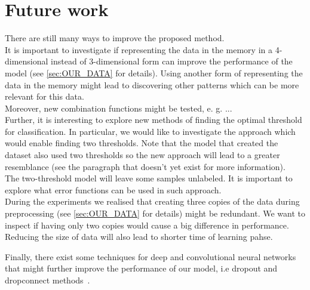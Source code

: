 \documentclass[a4paper,10pt]{report}
\begin{document}
    \section{Future work}
      There are still many ways to improve the proposed method.\\
      
      It is important to investigate if representing the data in the memory in a 4-dimensional instead of 3-dimensional form can improve the performance of the model (see \ref{sec:OUR_DATA} for details). Using another form of representing the data in the memory might lead to discovering other patterns which can be more relevant for this data.\\
      
      Moreover, new combination functions might be tested, e. g. ...\\ %
      
      Further, it is interesting to explore new methods of finding the optimal threshold for classification. In particular, we would like to investigate the approach which would enable finding two thresholds. Note that the model that created the dataset also used two thresholds so the new approach will lead to a greater resemblance (see the paragraph that doesn't yet exist for more information).\\
      
      The two-threshold model will leave some samples unlabeled. It is important to explore what error functions can be used in such approach.\\
      
      During the experiments we realised that creating three copies of the data during preprocessing (see \ref{sec:OUR_DATA} for details) might be redundant. We want to inspect if having only two copies would cause a big difference in performance. Reducing the size of data will also lead to shorter time of learning pahse.
      
      Finally, there exist some techniques for deep and convolutional neural networks that might further improve the performance of our model, i.e dropout and dropconnect methods~\cite{DUTCH}.
\end{document}
